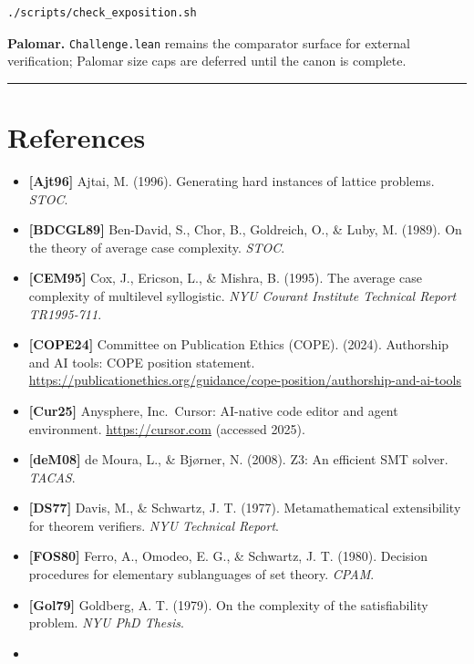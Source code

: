 \documentclass[11pt,a4paper]{article}
\begin{document}
\begin{verbatim}
./scripts/check_exposition.sh
\end{verbatim}

\textbf{Palomar.} \texttt{Challenge.lean} remains the comparator surface for external verification; Palomar size caps are deferred until the canon is complete.

\begin{center}\rule{0.5\linewidth}{0.5pt}\end{center}

\hypertarget{references}{%
\section{References}\label{references}}

\begin{itemize}
\item
  \textbf{{[}Ajt96{]}} Ajtai, M. (1996). Generating hard instances of lattice problems. \emph{STOC}.
\item
  \textbf{{[}BDCGL89{]}} Ben-David, S., Chor, B., Goldreich, O., \& Luby, M. (1989). On the theory of average case complexity. \emph{STOC}.
\item
  \textbf{{[}CEM95{]}} Cox, J., Ericson, L., \& Mishra, B. (1995). The average case complexity of multilevel syllogistic. \emph{NYU Courant Institute Technical Report TR1995-711}.
\item
  \textbf{{[}COPE24{]}} Committee on Publication Ethics (COPE). (2024). Authorship and AI tools: COPE position statement. \url{https://publicationethics.org/guidance/cope-position/authorship-and-ai-tools}
\item
  \textbf{{[}Cur25{]}} Anysphere, Inc.~Cursor: AI-native code editor and agent environment. \url{https://cursor.com} (accessed 2025).
\item
  \textbf{{[}deM08{]}} de Moura, L., \& Bjørner, N. (2008). Z3: An efficient SMT solver. \emph{TACAS}.
\item
  \textbf{{[}DS77{]}} Davis, M., \& Schwartz, J. T. (1977). Metamathematical extensibility for theorem verifiers. \emph{NYU Technical Report}.
\item
  \textbf{{[}FOS80{]}} Ferro, A., Omodeo, E. G., \& Schwartz, J. T. (1980). Decision procedures for elementary sublanguages of set theory. \emph{CPAM}.
\item
  \textbf{{[}Gol79{]}} Goldberg, A. T. (1979). On the complexity of the satisfiability problem. \emph{NYU PhD Thesis}.
\item

\end{itemize}
\end{document}
